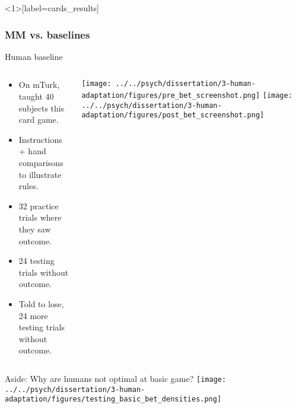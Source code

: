 \documentclass{beamer}
\begin{document}


\begin{frame}<1>[label=cards_results]
\frametitle{MM vs. baselines}
\end{frame}

\begin{frame}{Human baseline}
\begin{columns}
\begin{column}{0.5\textwidth}
\begin{itemize}
\item On mTurk, taught 40 subjects this card game.
\item Instructions + hand comparisons to illustrate rules.
\item 32 practice trials where they saw outcome.
\item 24 testing trials without outcome.
\item Told to lose, 24 more testing trials without outcome.
\end{itemize}
\end{column}

\begin{column}{0.5\textwidth}
\vspace{1em}
\texttt{[image: ../../psych/dissertation/3-human-adaptation/figures/pre\_bet\_screenshot.png]}
\texttt{[image: ../../psych/dissertation/3-human-adaptation/figures/post\_bet\_screenshot.png]}
\end{column}
\end{columns}

\end{frame}


\begin{frame}{Aside: Why are humans not optimal at basic game?}
\centering
\texttt{[image: ../../psych/dissertation/3-human-adaptation/figures/testing\_basic\_bet\_densities.png]}
\end{frame}
\end{document}
